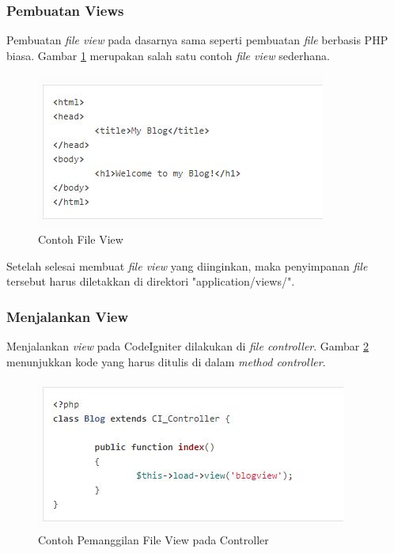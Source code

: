 		\subsubsection{Pembuatan Views}
		\label{subsub: pembuatanView}
		
		Pembuatan \textit{file view} pada dasarnya sama seperti pembuatan \textit{file} berbasis PHP biasa. Gambar \ref{fig:view} merupakan salah satu contoh \textit{file view} sederhana.
		
		\begin{figure}[H]
			\centering
			\includegraphics[scale=1]{Gambar/view}
			\caption{Contoh File View}
			\label{fig:view}
		\end{figure}
		
		Setelah selesai membuat \textit{file view} yang diinginkan, maka penyimpanan \textit{file} tersebut harus diletakkan di direktori "application/views/".
		
		\subsubsection{Menjalankan View}
		\label{subsub: menjalankanView}
		
		Menjalankan \textit{view} pada CodeIgniter dilakukan di \textit{file controller}. Gambar \ref{fig:controllerView} menunjukkan kode yang harus ditulis di dalam \textit{method controller}.
		
		\begin{figure}[H]
			\centering
			\includegraphics[scale=1]{Gambar/controllerView}
			\caption{Contoh Pemanggilan File View pada Controller}
			\label{fig:controllerView}
		\end{figure}
		
